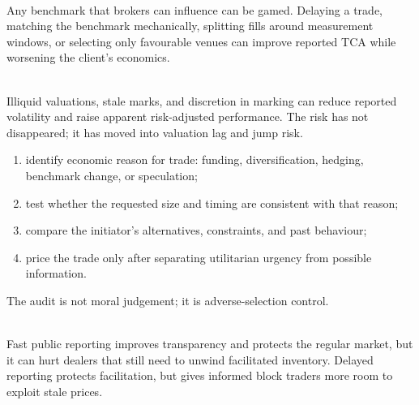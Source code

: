 \documentclass[a4paper,oneside,openany]{book}
\begin{document}
\begin{caveat} \\
Any benchmark that brokers can influence can be gamed. Delaying a trade, matching the benchmark mechanically, splitting fills around measurement windows, or selecting only favourable venues can improve reported TCA while worsening the client's economics.
\end{caveat}

\begin{caveat} \\
Illiquid valuations, stale marks, and discretion in marking can reduce reported volatility and raise apparent risk-adjusted performance. The risk has not disappeared; it has moved into valuation lag and jump risk.
\end{caveat}

\begin{process} 
\begin{enumerate}[label=\roman*.]
\setlength{\itemsep}{0pt}
\item identify economic reason for trade: funding, diversification, hedging, benchmark change, or speculation;
\item test whether the requested size and timing are consistent with that reason;
\item compare the initiator's alternatives, constraints, and past behaviour;
\item price the trade only after separating utilitarian urgency from possible information.
\end{enumerate}
The audit is not moral judgement; it is adverse-selection control.
\end{process}

\begin{caveat} \\
Fast public reporting improves transparency and protects the regular market, but it can hurt dealers that still need to unwind facilitated inventory. Delayed reporting protects facilitation, but gives informed block traders more room to exploit stale prices.
\end{caveat}
\end{document}
